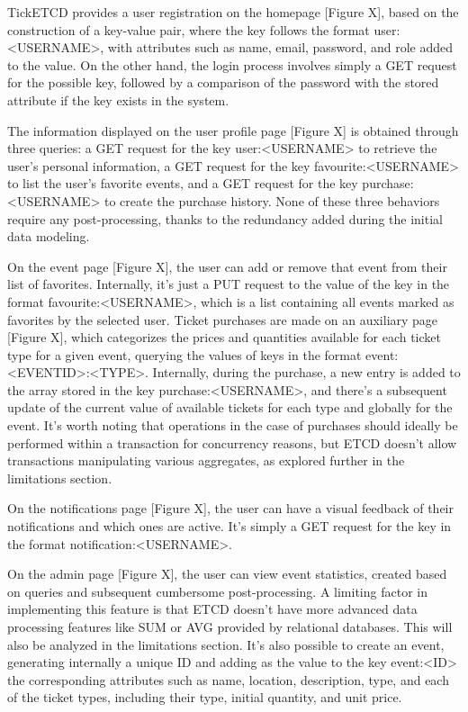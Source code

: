 \documentclass[screen,review]{acmart}
\begin{document}
TickETCD provides a user registration on the homepage [Figure X], based on the construction of a key-value pair, where the key follows the format user:<USERNAME>, with attributes such as name, email, password, and role added to the value. On the other hand, the login process involves simply a GET request for the possible key, followed by a comparison of the password with the stored attribute if the key exists in the system.

The information displayed on the user profile page [Figure X] is obtained through three queries: a GET request for the key user:<USERNAME> to retrieve the user's personal information, a GET request for the key favourite:<USERNAME> to list the user's favorite events, and a GET request for the key purchase:<USERNAME> to create the purchase history. None of these three behaviors require any post-processing, thanks to the redundancy added during the initial data modeling.

On the event page [Figure X], the user can add or remove that event from their list of favorites. Internally, it's just a PUT request to the value of the key in the format favourite:<USERNAME>, which is a list containing all events marked as favorites by the selected user. Ticket purchases are made on an auxiliary page [Figure X], which categorizes the prices and quantities available for each ticket type for a given event, querying the values of keys in the format event:<EVENTID>:<TYPE>. Internally, during the purchase, a new entry is added to the array stored in the key purchase:<USERNAME>, and there's a subsequent update of the current value of available tickets for each type and globally for the event. It's worth noting that operations in the case of purchases should ideally be performed within a transaction for concurrency reasons, but ETCD doesn't allow transactions manipulating various aggregates, as explored further in the limitations section.

On the notifications page [Figure X], the user can have a visual feedback of their notifications and which ones are active. It's simply a GET request for the key in the format notification:<USERNAME>.

On the admin page [Figure X], the user can view event statistics, created based on queries and subsequent cumbersome post-processing. A limiting factor in implementing this feature is that ETCD doesn't have more advanced data processing features like SUM or AVG provided by relational databases. This will also be analyzed in the limitations section. It's also possible to create an event, generating internally a unique ID and adding as the value to the key event:<ID> the corresponding attributes such as name, location, description, type, and each of the ticket types, including their type, initial quantity, and unit price.
\end{document}
